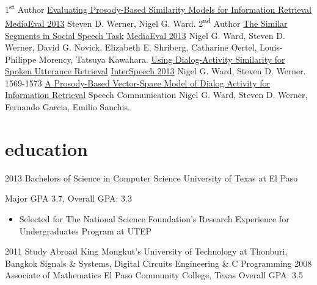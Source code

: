\documentclass[]{friggeri-cv} %
\begin{document}
\begin{entrylist}
\entry
{1\textsuperscript{st} Author}
{\href{http://ceur-ws.org/Vol-1043/mediaeval2013_submission_52.pdf}{Evaluating Prosody-Based Similarity Models for Information Retrieval}}
{\href{http://ceur-ws.org/Vol-1043/}{MediaEval 2013}}
{Steven D. Werner, Nigel G. Ward.}
\entry
{2\textsuperscript{nd} Author}
{\href{http://ceur-ws.org/Vol-1043/mediaeval2013_submission_2.pdf}{The Similar Segments in Social Speech Task} }
{\href{http://ceur-ws.org/Vol-1043/}{MediaEval 2013}}
{Nigel G. Ward, Steven D. Werner, David G. Novick, Elizabeth E. Shriberg, Catharine Oertel, Louis-Philippe Morency, Tatsuya Kawahara.}
\entry
{}
{\href{http://www.isca-speech.org/archive/interspeech_2013/i13_1569.html}{Using Dialog-Activity Similarity for Spoken Utterance Retrieval}}
{\href{http://www.isca-speech.org/archive/interspeech_2013/}{InterSpeech 2013}}
{Nigel G. Ward, Steven D. Werner. 1569-1573}
\entry
{}
{\href{http://www.cs.utep.edu/nigel/abstracts/prosody-ir.html}{A Prosody-Based Vector-Space Model of Dialog Activity for Information Retrieval}}
{Speech Communication}
{Nigel G. Ward, Steven D. Werner, Fernando Garcia, Emilio Sanchis.}
\end{entrylist}


\section{education}

\begin{entrylist}
\entry
{2013}
{Bachelors {\normalfont of Science in Computer Science}}
{University of Texas at El Paso}
{Major GPA 3.7, Overall GPA: 3.3
\begin{itemize}
\item Selected for The National Science Foundation's Research Experience for Undergraduates Program at UTEP
\end{itemize}}
\entry
{2011}
{{\normalfont Study Abroad}}
{King Mongkut’s University of Technology at Thonburi, Bangkok}
{Signals \& Systems, Digital Circuits Engineering \& C Programming}
\entry
{2008}
{Associate {\normalfont of Mathematics}}
{El Paso Community College, Texas}
{Overall GPA: 3.5}
\end{entrylist}
\end{document}

